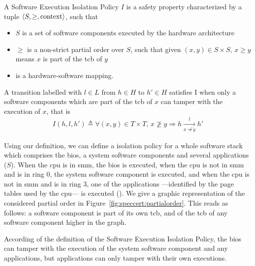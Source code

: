 \begin{definition}
  \label{def:softwareisolation}
  A Software Execution Isolation Policy $I$ is a safety property characterized
  by a tuple $\langle S, \ge, \mathrm{context} \rangle$, such that
  \begin{itemize}
  \item $S$ is a set of software components executed by the hardware
    architecture
  \item $\ge$ is a non-strict partial order over $S$, such that given
    $(x, y) \in S \times S$, $x \ge y$ means $x$ is part of the \ac{tcb} of $y$
  \item {} is a hardware-software mapping.
  \end{itemize}

  A transition labelled with $l \in L$ from $h \in H$ to $h' \in H$ satisfies I
  when only a software components which are part of the \ac{tcb} of $x$ can
  tamper with the execution of $x$, that is
  \[
    \begin{array}{l}
      I(h, l, h') \triangleq
      \forall (x, y) \in T \times T \text{, } x \not\ge y \Rightarrow h \xrightarrow[x
      \not\leadsto y]{l} h'
    \end{array}
  \]
\end{definition}

\begin{example}
  \label{example:speccert:ssisolation}
  Using our definition, we can define a isolation policy for a whole software
  stack which comprises the \ac{bios}, a system software components and several
  applications ($S$).
  When the \ac{cpu} is in \ac{smm}, the \ac{bios} is executed, when the \ac{cpu}
  is not in \ac{smm} and is in ring 0, the system software component is
  executed, and when the \ac{cpu} is not in \ac{smm} and is in ring 3, one of
  the applications ---identified by the page tables used by the \ac{cpu}--- is
  executed ().
  We give a graphic representation of the considered partial order in
  Figure~\ref{fig:speccert:partialorder}.
  This reads as follows: a software component is part of its own \ac{tcb}, and
  of the \ac{tcb} of any software component higher in the graph.

  According of the definition of the Software Execution Isolation Policy, the
  \ac{bios} can tamper with the execution of the system software component and
  any applications, but applications can only tamper with their own executions.
\end{example}

